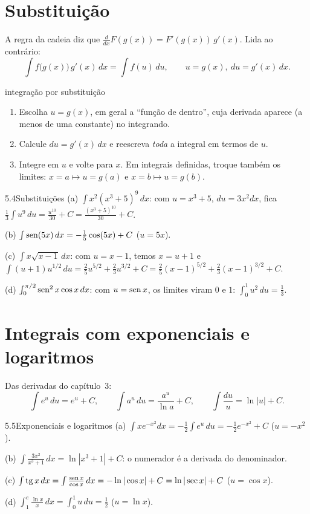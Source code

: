 \section{Substituição}

A regra da cadeia diz que $\frac{d}{dx}F(g(x))=F'(g(x))\,g'(x)$. Lida ao contrário:
\[
\int f\big(g(x)\big)\,g'(x)\,dx=\int f(u)\,du,\qquad u=g(x),\ du=g'(x)\,dx .
\]

\begin{estrategia}{integração por substituição}
\begin{enumerate}[label=\arabic*.]
\item Escolha $u=g(x)$, em geral a ``função de dentro'', cuja derivada aparece (a menos de
  uma constante) no integrando.
\item Calcule $du=g'(x)\,dx$ e reescreva \emph{toda} a integral em termos de $u$.
\item Integre em $u$ e volte para $x$. Em integrais definidas, troque também os limites:
  $x=a\mapsto u=g(a)$ e $x=b\mapsto u=g(b)$.
\end{enumerate}
\end{estrategia}

\begin{exemplo}{5.4}{Substituições}
(a) $\int x^2(x^3+5)^9\,dx$: com $u=x^3+5$, $du=3x^2dx$, fica
$\frac13\int u^9\,du=\frac{u^{10}}{30}+C=\frac{(x^3+5)^{10}}{30}+C$.

(b) $\int\operatorname{sen}(5x)\,dx=-\frac15\cos(5x)+C$ \quad ($u=5x$).

(c) $\int x\sqrt{x-1}\,dx$: com $u=x-1$, temos $x=u+1$ e
$\int(u+1)u^{1/2}\,du=\frac25u^{5/2}+\frac23u^{3/2}+C=\frac25(x-1)^{5/2}+\frac23(x-1)^{3/2}+C$.

(d) $\int_0^{\pi/2}\operatorname{sen}^2x\cos x\,dx$: com $u=\operatorname{sen} x$, os limites viram $0$ e $1$:
$\int_0^1u^2\,du=\frac13$.
\end{exemplo}

\section{Integrais com exponenciais e logaritmos}

Das derivadas do capítulo~3:
\[
\int e^u\,du=e^u+C,\qquad \int a^u\,du=\frac{a^u}{\ln a}+C,\qquad \int\frac{du}u=\ln|u|+C .
\]

\begin{exemplo}{5.5}{Exponenciais e logaritmos}
(a) $\int xe^{-x^2}dx=-\frac12\int e^u\,du=-\frac12e^{-x^2}+C$ \quad ($u=-x^2$).

(b) $\int\frac{3x^2}{x^3+1}\,dx=\ln|x^3+1|+C$: o numerador é a derivada do denominador.

(c) $\int\operatorname{tg} x\,dx=\int\frac{\operatorname{sen} x}{\cos x}\,dx=-\ln|\cos x|+C=\ln|\sec x|+C$ \quad
($u=\cos x$).

(d) $\int_1^e\frac{\ln x}x\,dx=\int_0^1u\,du=\frac12$ \quad ($u=\ln x$).
\end{exemplo}

